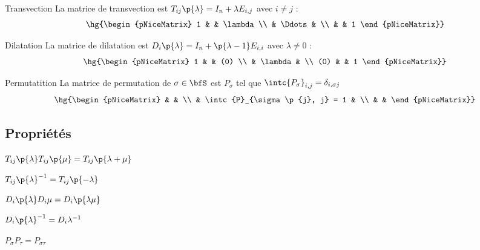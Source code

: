 \documentclass[a4paper,french,bookmarks]{book}
\begin{document}
    \begin{definition}{Transvection}{}
        La matrice de transvection est $T_{ij}\p{\lambda} = I_n + \lambda E_{i, j}$ avec $i \neq j$ :
        \[ \hg{\begin{pNiceMatrix}
            1 & & \lambda \\
             & \Ddots & \\
             & & 1
        \end{pNiceMatrix}}\]
    \end{definition}
    
    \begin{definition}{Dilatation}{}
        La matrice de dilatation est $D_i\p{\lambda} = I_n + \p{\lambda - 1}E_{i, i}$ avec $\lambda \neq 0$ :
        \[ \hg{\begin{pNiceMatrix}
            1 & & (0) \\
             & \lambda & \\
            (0) & & 1
        \end{pNiceMatrix}}\]
    \end{definition}
    
    \begin{definition}{Permutatition}{}
        La matrice de permutation de $\sigma \in \bfS$ est $P_{\sigma}$ tel que $\intc{P_\sigma}_{i, j} = \delta_{i, \sigma{j}}$
        \[ \hg{\begin{pNiceMatrix}
             & &  \\
             & \intc{P}_{\sigma\p{j}, j} = 1 & \\
             & & 
        \end{pNiceMatrix}}\]
    \end{definition}
    
    \subsection{Propriétés}
    
    \begin{property}{}{}
        \begin{enumerate}
            \itast $T_{ij}\p{\lambda}T_{ij}\p{\mu} = T_{ij}\p{\lambda + \mu}$
            
            \itast $T_{ij}\p{\lambda}^{-1} = T_{ij}\p{-\lambda}$
            
            \itast $D_i\p{\lambda}D_i{\mu} = D_i\p{\lambda\mu}$
            
            \itast $D_i\p{\lambda}^{-1} = D_i{\lambda^{-1}}$
            
            \itast $P_\sigma P_\tau = P_{\sigma\tau}$
        \end{enumerate}
    \end{property}
    
\end{document}
